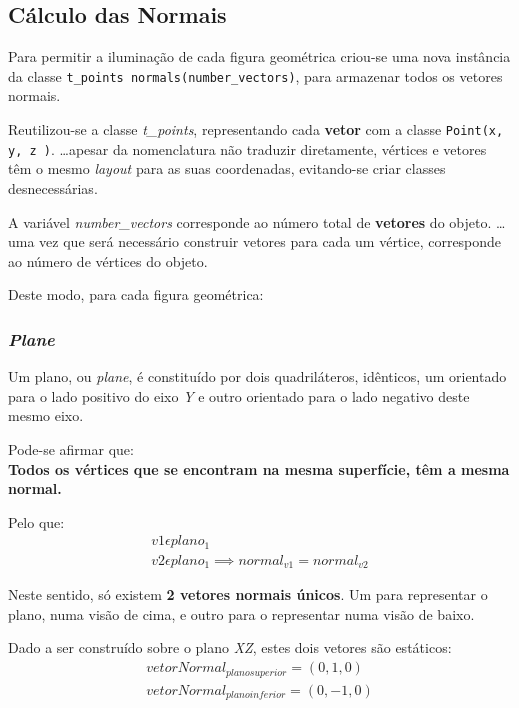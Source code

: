 \documentclass[relatorio.tex]{subfiles}
\begin{document}
\subsection{Cálculo das Normais} \label{subsec:normals}
Para permitir a iluminação de cada figura geométrica 
criou-se uma nova instância da classe 
\texttt{t_points normals(number_vectors)}, 
para armazenar todos os vetores normais.

Reutilizou-se a classe \textit{t\_points},
representando cada \textbf{vetor} com
a classe \texttt{Point(x, y, z )}.
\dots apesar da nomenclatura não traduzir
diretamente, vértices e vetores têm o mesmo 
\textit{layout} para as suas coordenadas, 
evitando-se criar classes desnecessárias.

A variável \textit{number\_vectors} corresponde ao 
número total de \textbf{vetores} do objeto.
\dots uma vez que será necessário construir vetores 
para cada um vértice, corresponde ao número de 
vértices do objeto.

Deste modo, para cada figura geométrica:

\subsubsection{\textit{Plane}}

Um plano, ou \textit{plane}, é constituído por dois quadriláteros,
idênticos, um orientado para o lado positivo do eixo \textit{Y}
e outro orientado para o lado negativo deste mesmo eixo.

Pode-se afirmar que: \\
\textbf{Todos os vértices que se encontram na mesma superfície, 
têm a mesma normal.}

Pelo que:
\begin{eqnarray}
    v1 \epsilon plano_{1} \\
    v2\epsilon plano_{1} \implies normal_{v1} = normal_{v2}
\end{eqnarray}

Neste sentido, só existem \textbf{2 vetores normais únicos}.
Um para representar o plano, numa visão de cima,
e outro para o representar numa visão de baixo.

Dado a ser construído sobre o plano \textit{XZ}, 
estes dois vetores são estáticos:
\begin{eqnarray}
    vetorNormal_{plano superior} = (0,1,0) \\
    vetorNormal_{plano inferior} = (0,-1,0) 
\end{eqnarray}
\end{document}
